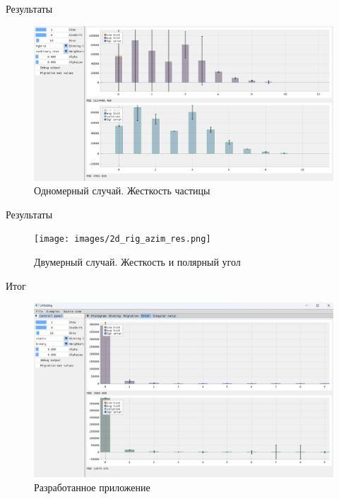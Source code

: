 \documentclass[fullscreen=true,russian,compress,%
	hyperref={unicode,bookmarks=false}]{presentation}
\begin{document}
\begin{frame}{Результаты}
   \begin{figure}[h!]
      \centering
      \includegraphics[width=\linewidth]{images/1d_rig_res.png}
      \caption{Одномерный случай. Жесткость частицы}
   \end{figure}
   
\end{frame}

\begin{frame}{Результаты}
   \begin{figure}[h!]
      \centering
      \texttt{[image: images/2d\_rig\_azim\_res.png]}
      \caption{Двумерный случай. Жесткость и полярный угол}
   \end{figure}
\end{frame}

\begin{frame}{Итог}
   \begin{figure}[h!]
      \centering
      \includegraphics[width=\linewidth]{images/app_example.png}
      \caption{Разработанное приложение}
   \end{figure}
\end{frame}
\end{document}
